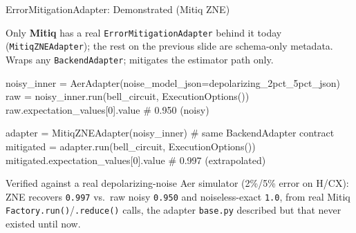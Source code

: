 \documentclass[
  ignorenonframetext,
  aspectratio=169,
]{beamer}
\newenvironment{Shaded}{\begin{snugshade}}{\end{snugshade}}
\newcommand{\CommentTok}[1]{\textcolor[rgb]{0.48,0.49,0.49}{#1}}
\newcommand{\DecValTok}[1]{\textcolor[rgb]{0.96,0.45,0.00}{#1}}
\newcommand{\NormalTok}[1]{\textcolor[rgb]{0.81,0.81,0.76}{#1}}
\newcommand{\OperatorTok}[1]{\textcolor[rgb]{0.81,0.81,0.76}{#1}}
\begin{document}
\begin{frame}[fragile]{ErrorMitigationAdapter: Demonstrated (Mitiq ZNE)}
\label{errormitigationadapter-demonstrated-mitiq-zne}
\scriptsize

Only \textbf{Mitiq} has a real \texttt{ErrorMitigationAdapter} behind it
today (\texttt{MitiqZNEAdapter}); the rest on the previous slide are
schema-only metadata. Wraps any \texttt{BackendAdapter}; mitigates the
estimator path only.

\begin{Shaded}
\begin{Highlighting}[]
\NormalTok{noisy\_inner }\OperatorTok{=}\NormalTok{ AerAdapter(noise\_model\_json}\OperatorTok{=}\NormalTok{depolarizing\_2pct\_5pct\_json)}
\NormalTok{raw }\OperatorTok{=}\NormalTok{ noisy\_inner.run(bell\_circuit, ExecutionOptions())}
\NormalTok{raw.expectation\_values[}\DecValTok{0}\NormalTok{].value             }\CommentTok{\# 0.950  (noisy)}

\NormalTok{adapter }\OperatorTok{=}\NormalTok{ MitiqZNEAdapter(noisy\_inner)      }\CommentTok{\# same BackendAdapter contract}
\NormalTok{mitigated }\OperatorTok{=}\NormalTok{ adapter.run(bell\_circuit, ExecutionOptions())}
\NormalTok{mitigated.expectation\_values[}\DecValTok{0}\NormalTok{].value       }\CommentTok{\# 0.997  (extrapolated)}
\end{Highlighting}
\end{Shaded}

Verified against a real depolarizing-noise Aer simulator (2\%/5\% error
on H/CX): ZNE recovers \texttt{0.997} vs.~raw noisy \texttt{0.950} and
noiseless-exact \texttt{1.0}, from real Mitiq
\texttt{Factory.run()}/\texttt{.reduce()} calls, the adapter
\texttt{base.py} described but that never existed until now. \normalsize
\end{frame}
\end{document}
